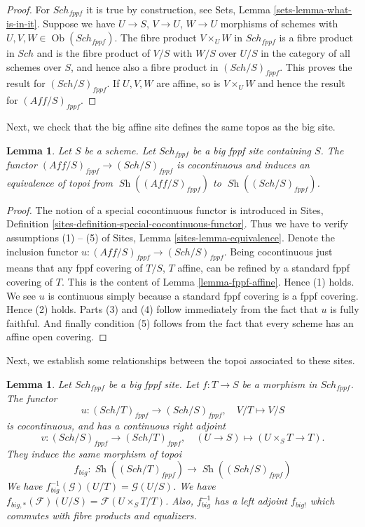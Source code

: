 \documentclass{stacks-project}
\theoremstyle{plain}
\newtheorem{lemma}[subsection]{Lemma}
\theoremstyle{definition}
\theoremstyle{remark}
\numberwithin{equation}{subsection}
\def\Sch{\mathit{Sch}}
\def\Ob{\mathop{\mathrm{Ob}}\nolimits}
\def\Sh{\mathop{\mathit{Sh}}\nolimits}
\begin{document}
\begin{proof}
For $\Sch_{fppf}$ it is true by construction, see
Sets, Lemma \ref{sets-lemma-what-is-in-it}.
Suppose we have $U \to S$, $V \to U$, $W \to U$ morphisms
of schemes with $U, V, W \in \Ob(\Sch_{fppf})$.
The fibre product $V \times_U W$ in $\Sch_{fppf}$
is a fibre product in $\Sch$ and
is the fibre product of $V/S$ with $W/S$ over $U/S$ in
the category of all schemes over $S$, and hence also a
fibre product in $(\Sch/S)_{fppf}$.
This proves the result for $(\Sch/S)_{fppf}$.
If $U, V, W$ are affine, so is $V \times_U W$ and hence the
result for $(\textit{Aff}/S)_{fppf}$.
\end{proof}

\noindent
Next, we check that the big affine site defines the same
topos as the big site.

\begin{lemma}
\label{lemma-affine-big-site-fppf}
Let $S$ be a scheme. Let $\Sch_{fppf}$ be a big fppf
site containing $S$.
The functor $(\textit{Aff}/S)_{fppf} \to (\Sch/S)_{fppf}$
is cocontinuous and induces an equivalence of topoi from
$\Sh((\textit{Aff}/S)_{fppf})$ to
$\Sh((\Sch/S)_{fppf})$.
\end{lemma}

\begin{proof}
The notion of a special cocontinuous functor is introduced in
Sites, Definition \ref{sites-definition-special-cocontinuous-functor}.
Thus we have to verify assumptions (1) -- (5) of
Sites, Lemma \ref{sites-lemma-equivalence}.
Denote the inclusion functor
$u : (\textit{Aff}/S)_{fppf} \to (\Sch/S)_{fppf}$.
Being cocontinuous just means that any fppf covering of
$T/S$, $T$ affine, can be refined by a standard fppf covering of $T$.
This is the content of
Lemma \ref{lemma-fppf-affine}.
Hence (1) holds. We see $u$ is continuous simply because a standard
fppf covering is a fppf covering. Hence (2) holds.
Parts (3) and (4) follow immediately from the fact that $u$ is
fully faithful. And finally condition (5) follows from the
fact that every scheme has an affine open covering.
\end{proof}

\noindent
Next, we establish some relationships between the topoi
associated to these sites.

\begin{lemma}
\label{lemma-morphism-big-fppf}
Let $\Sch_{fppf}$ be a big fppf site.
Let $f : T \to S$ be a morphism in $\Sch_{fppf}$.
The functor
$$
u : (\Sch/T)_{fppf} \longrightarrow (\Sch/S)_{fppf},
\quad
V/T \longmapsto V/S
$$
is cocontinuous, and has a continuous right adjoint
$$
v : (\Sch/S)_{fppf} \longrightarrow (\Sch/T)_{fppf},
\quad
(U \to S) \longmapsto (U \times_S T \to T).
$$
They induce the same morphism of topoi
$$
f_{big} :
\Sh((\Sch/T)_{fppf})
\longrightarrow
\Sh((\Sch/S)_{fppf})
$$
We have $f_{big}^{-1}(\mathcal{G})(U/T) = \mathcal{G}(U/S)$.
We have $f_{big, *}(\mathcal{F})(U/S) = \mathcal{F}(U \times_S T/T)$.
Also, $f_{big}^{-1}$ has a left adjoint $f_{big!}$ which commutes with
fibre products and equalizers.
\end{lemma}
\end{document}
